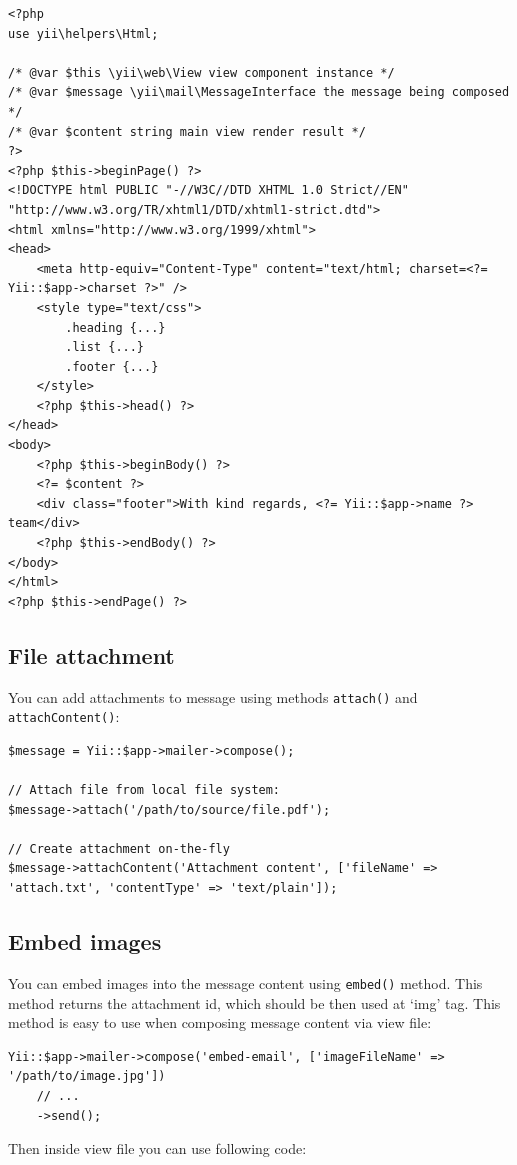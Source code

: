 \lstset{language=php}\begin{lstlisting}
<?php
use yii\helpers\Html;

/* @var $this \yii\web\View view component instance */
/* @var $message \yii\mail\MessageInterface the message being composed */
/* @var $content string main view render result */
?>
<?php $this->beginPage() ?>
<!DOCTYPE html PUBLIC "-//W3C//DTD XHTML 1.0 Strict//EN" "http://www.w3.org/TR/xhtml1/DTD/xhtml1-strict.dtd">
<html xmlns="http://www.w3.org/1999/xhtml">
<head>
    <meta http-equiv="Content-Type" content="text/html; charset=<?= Yii::$app->charset ?>" />
    <style type="text/css">
        .heading {...}
        .list {...}
        .footer {...}
    </style>
    <?php $this->head() ?>
</head>
<body>
    <?php $this->beginBody() ?>
    <?= $content ?>
    <div class="footer">With kind regards, <?= Yii::$app->name ?> team</div>
    <?php $this->endBody() ?>
</body>
</html>
<?php $this->endPage() ?>
\end{lstlisting}
\subsection{File attachment}
You can add attachments to message using methods \lstinline|attach()| and \lstinline|attachContent()|:

\lstset{language=php}\begin{lstlisting}
$message = Yii::$app->mailer->compose();

// Attach file from local file system:
$message->attach('/path/to/source/file.pdf');

// Create attachment on-the-fly
$message->attachContent('Attachment content', ['fileName' => 'attach.txt', 'contentType' => 'text/plain']);
\end{lstlisting}
\subsection{Embed images}
You can embed images into the message content using \lstinline|embed()| method. This method returns the attachment id,
which should be then used at `img' tag.
This method is easy to use when composing message content via view file:

\lstset{language=php}\begin{lstlisting}
Yii::$app->mailer->compose('embed-email', ['imageFileName' => '/path/to/image.jpg'])
    // ...
    ->send();
\end{lstlisting}
Then inside view file you can use following code:

